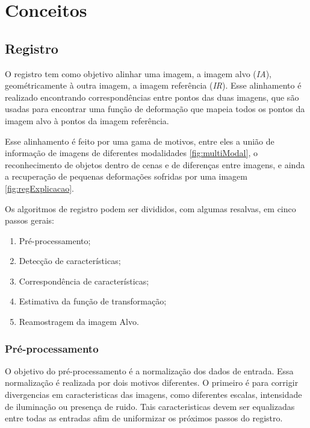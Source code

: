 \chapter{Conceitos}
\label{cap:conceitos}

\section{Registro}
\label{sec:fundamentos}

  O registro tem como objetivo alinhar uma imagem, a imagem alvo (\textit{IA}),
geométricamente à outra imagem, a imagem referência (\textit{IR}). Esse
alinhamento é realizado encontrando correspondências entre pontos das duas imagens,
que são usadas para encontrar uma função de deformação que mapeia todos os
pontos da imagem alvo à pontos da imagem referência.

  Esse alinhamento é feito por uma gama de motivos, entre eles a união de informação
de imagens de diferentes modalidades \ref{fig:multiModal}, o reconhecimento de
objetos dentro de cenas e de diferenças entre imagens, e ainda a recuperação de
pequenas deformações sofridas por uma imagem \ref{fig:regExplicacao}.

Os algoritmos de registro podem ser divididos, com algumas resalvas, em cinco
passos gerais:
\begin{enumerate}
    \item Pré-processamento;
    \item Detecção de características;
    \item Correspondência de características;
    \item Estimativa da função de transformação;
    \item Reamostragem da imagem Alvo.
\end{enumerate} %

\subsection{Pré-processamento}
  O objetivo do pré-processamento é a normalização dos dados de entrada. Essa
normalização é realizada por dois motivos diferentes. O primeiro é para corrigir
divergencias em caracteristicas das imagens, como diferentes escalas, intensidade
de iluminação ou presença de ruido. Tais caracteristicas devem ser equalizadas
entre todas as entradas afim de uniformizar os próximos passos do registro.

